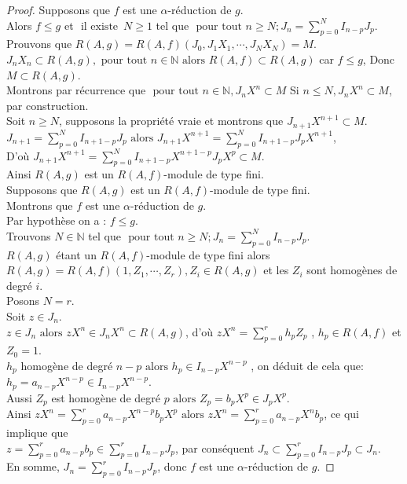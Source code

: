 \begin{proof}
	Supposons que $f$ est une $\alpha$-réduction de $g$.\\
	Alors $f \leq g$ et $\text{ il existe } \, N \geq 1$ tel que $\text{ pour tout } n \geq N ; J_n = \displaystyle \sum_{p=0}^{N}{I_{n-p} J_p}$.\\
	Prouvons que $R(A,g) = R(A,f)(J_0, J_1X_1, \cdots , J_NX_N) = M$.\\
	$J_nX_n \subset R(A,g), \text{ pour tout } n \in \mathbb{N} \text{ alors } R(A,f) \subset R(A,g)$ car $f \leq g$,
	Donc $M \subset R(A,g)$.\\
	Montrons par récurrence que $\text{ pour tout } n \in \mathbb{N}, J_nX^n \subset M$
	Si $n \leq N, J_nX^n \subset M$, par construction.\\
	Soit $n \geq N$, supposons la propriété vraie et montrons que $J_{n+1}X^{n+1} \subset M$.\\
	$J_{n+1} = \displaystyle \sum_{p=0}^{N}{I_{n+1-p} J_p} \text{ alors } J_{n+1}X^{n+1} = \displaystyle \sum_{p=0}^{N}{I_{n+1-p} J_pX^{n+1}}$, \\
	D’où $ J_{n+1}X^{n+1} = \displaystyle \sum_{p=0}^{N}{I_{n+1-p}X^{n+1-p} J_pX^{p}} \subset M$.\\
	Ainsi $R(A,g)$ est un $R(A,f)$-module de type fini.\\
	Supposons que $R(A,g)$ est un $R(A,f)$-module de type fini.\\
	Montrons que $f$ est une $\alpha$-réduction de $g$.\\
	Par hypothèse on a : $f \leq g$.\\
	Trouvons $N \in \mathbb{N}$ tel que $\text{ pour tout } n \geq N ; J_n = \displaystyle \sum_{p=0}^{N}{I_{n-p} J_p}$.\\
	$R(A,g)$ étant un $R(A,f)$-module de type fini alors \\
	$R(A,g) = R(A,f)(1, Z_1, \cdots , Z_r), Z_i \in R(A,g)$ et les $Z_i$ sont homogènes de degré $i$.\\
	Posons $N=r$.\\
	Soit $z \in J_n$.\\
	$z \in J_n \text{ alors } zX^n \in J_nX^n \subset R(A,g)$, d'où $zX^n = \displaystyle \sum_{p=0}^{r}{h_p Z_p}$ , $h_p \in R(A,f)$ et $Z_0 = 1$.\\
	$h_p$ homogène de degré $n-p \text{ alors } h_p \in I_{n-p}X^{n-p}$ , on déduit de cela que:\\ $h_p = a_{n-p}X^{n-p} \in I_{n-p}X^{n-p}$.\\
	Aussi $Z_p$ est homogène de degré $p \text{ alors } Z_p = b_{p}X^{p} \in J_pX^p$.\\
	Ainsi $zX^n = \displaystyle \sum_{p=0}^{r}{a_{n-p}X^{n-p} b_{p}X^{p}} \text{ alors } zX^n = \displaystyle \sum_{p=0}^{r}{a_{n-p}X^{n} b_{p}}$, ce qui implique que \\ $z = \displaystyle \sum_{p=0}^{r}{a_{n-p} b_{p}} \in \displaystyle \sum_{p=0}^{r}{I_{n-p} J_{p}}$, par conséquent $J_n \subset \displaystyle \sum_{p=0}^{r}{I_{n-p} J_{p}} \subset J_n$.\\
	En somme, $J_n = \displaystyle \sum_{p=0}^{r}{I_{n-p} J_{p}}$, donc $f$ est une $\alpha$-réduction de $g$.
\end{proof}
